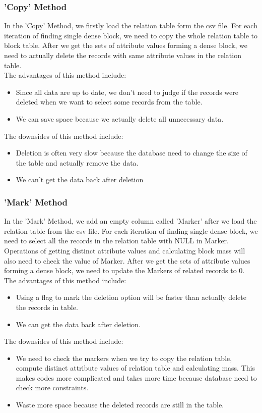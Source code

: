 \subsubsection{'Copy' Method}
In the 'Copy' Method, we firstly load the relation table form the csv file. For each iteration of finding single dense block, we need to copy the whole relation table to block table. After we get the sets of attribute values forming a dense block, we need to actually delete the records with same attribute values in the relation table. \\
The advantages of this method include: 
\begin{itemize}
    \item Since all data are up to date, we don't need to judge if the records were deleted when we want to select some records from the table.
    \item We can save space because we actually delete all unnecessary data.
\end{itemize}
The downsides of this method include:
\begin{itemize}
    \item Deletion is often very slow because the database need to change the size of the table and actually remove the data.
    \item We can't get the data back after deletion
\end{itemize}
 
\subsubsection{'Mark' Method}
In the 'Mark' Method, we add an empty column called 'Marker' after we load the relation table from the csv file. For each iteration of finding single dense block, we need to select all the records in the relation table with NULL in Marker. Operations of getting distinct attribute values and calculating block mass will also need to check the value of Marker. After we get the sets of attribute values forming a dense block, we need to update the Markers of related records to 0. \\
The advantages of this method include:
\begin{itemize}
    \item Using a flag to mark the deletion option will be faster than actually delete the records in table.
    \item We can get the data back after deletion.
\end{itemize}
The downsides of this method include:
\begin{itemize}
    \item We need to check the markers when we try to copy the relation table, compute distinct attribute values of relation table and calculating mass. This makes codes more complicated and takes more time because database need to check more constraints.
    \item Waste more space because the deleted records are still in the table.
\end{itemize}


